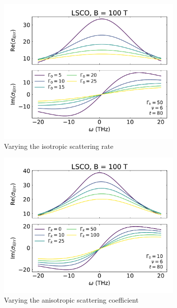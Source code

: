\documentclass[12pt]{article}
\begin{document}
\begin{figure}
    \centering
    \begin{subfigure}{0.495\textwidth}
        \includegraphics[width=\textwidth]{figures/vary_gamma_0}
        \caption{Varying the isotropic scattering rate}
    \end{subfigure}
    \begin{subfigure}{0.495\textwidth}
        \includegraphics[width=\textwidth]{figures/vary_gamma_k}
        \caption{Varying the anisotropic scattering coefficient}
    \end{subfigure}
    \begin{subfigure}{0.495\textwidth}

\end{subfigure}
\end{figure}
\end{document}
